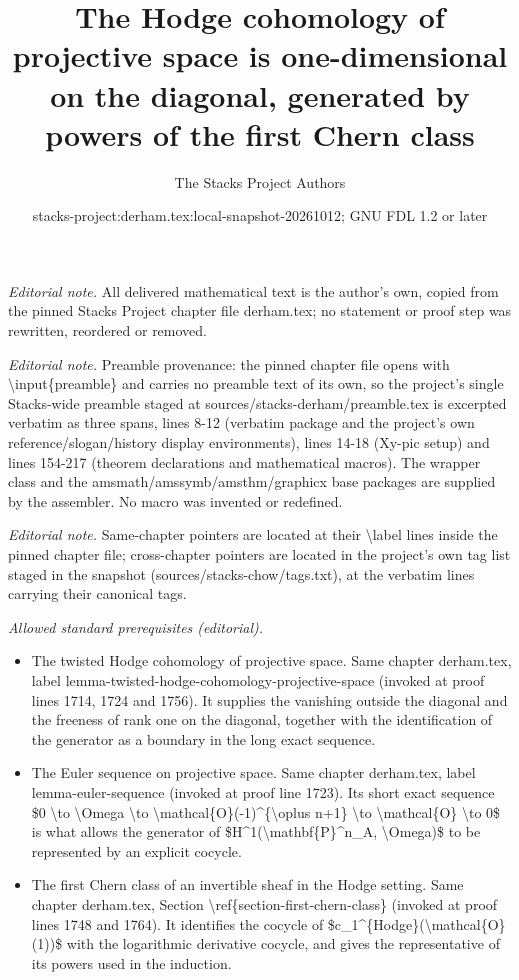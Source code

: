 \documentclass[10pt,a4paper]{amsart}
\title{The Hodge cohomology of projective space is one-dimensional on the diagonal, generated by powers of the first Chern class}
\author{The Stacks Project Authors}
\date{stacks-project:derham.tex:local-snapshot-20261012; GNU FDL 1.2 or later}
\theoremstyle{plain}
\theoremstyle{definition}
\theoremstyle{remark}
\numberwithin{equation}{subsection}
\begin{document}
\maketitle
\noindent\textit{Editorial note.} All delivered mathematical text is the author's own, copied from the pinned Stacks Project chapter file derham.tex; no statement or proof step was rewritten, reordered or removed.\par\medskip
\noindent\textit{Editorial note.} Preamble provenance: the pinned chapter file opens with \textbackslash{}input\{preamble\} and carries no preamble text of its own, so the project's single Stacks-wide preamble staged at sources/stacks-derham/preamble.tex is excerpted verbatim as three spans, lines 8-12 (verbatim package and the project's own reference/slogan/history display environments), lines 14-18 (Xy-pic setup) and lines 154-217 (theorem declarations and mathematical macros). The wrapper class and the amsmath/amssymb/amsthm/graphicx base packages are supplied by the assembler. No macro was invented or redefined.\par\medskip
\noindent\textit{Editorial note.} Same-chapter pointers are located at their \textbackslash{}label lines inside the pinned chapter file; cross-chapter pointers are located in the project's own tag list staged in the snapshot (sources/stacks-chow/tags.txt), at the verbatim lines carrying their canonical tags.\par\medskip
\noindent\textit{Allowed standard prerequisites (editorial).}\begin{itemize}
\item The twisted Hodge cohomology of projective space. Same chapter derham.tex, label lemma-twisted-hodge-cohomology-projective-space (invoked at proof lines 1714, 1724 and 1756). It supplies the vanishing outside the diagonal and the freeness of rank one on the diagonal, together with the identification of the generator as a boundary in the long exact sequence.
\item The Euler sequence on projective space. Same chapter derham.tex, label lemma-euler-sequence (invoked at proof line 1723). Its short exact sequence \$0 \textbackslash{}to \textbackslash{}Omega \textbackslash{}to \textbackslash{}mathcal\{O\}(-1)\textasciicircum{}\{\textbackslash{}oplus n+1\} \textbackslash{}to \textbackslash{}mathcal\{O\} \textbackslash{}to 0\$ is what allows the generator of \$H\textasciicircum{}1(\textbackslash{}mathbf\{P\}\textasciicircum{}n\_A, \textbackslash{}Omega)\$ to be represented by an explicit cocycle.
\item The first Chern class of an invertible sheaf in the Hodge setting. Same chapter derham.tex, Section \textbackslash{}ref\{section-first-chern-class\} (invoked at proof lines 1748 and 1764). It identifies the cocycle of \$c\_1\textasciicircum{}\{Hodge\}(\textbackslash{}mathcal\{O\}(1))\$ with the logarithmic derivative cocycle, and gives the representative of its powers used in the induction.
\end{itemize}\medskip
\end{document}
